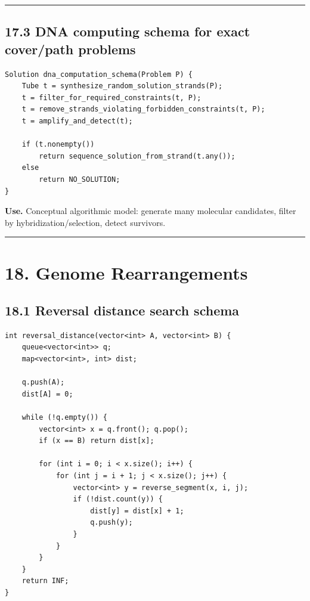 \documentclass[11pt]{article}
\begin{document}
\begin{center}\rule{0.5\linewidth}{0.5pt}\end{center}

\subsection{17.3 DNA computing schema for exact cover/path problems}\label{dna-computing-schema-for-exact-coverpath-problems}

\begin{verbatim}
Solution dna_computation_schema(Problem P) {
    Tube t = synthesize_random_solution_strands(P);
    t = filter_for_required_constraints(t, P);
    t = remove_strands_violating_forbidden_constraints(t, P);
    t = amplify_and_detect(t);

    if (t.nonempty())
        return sequence_solution_from_strand(t.any());
    else
        return NO_SOLUTION;
}
\end{verbatim}

\textbf{Use.} Conceptual algorithmic model: generate many molecular candidates, filter by hybridization/selection, detect survivors.

\begin{center}\rule{0.5\linewidth}{0.5pt}\end{center}

\section{18. Genome Rearrangements}\label{genome-rearrangements}

\subsection{18.1 Reversal distance search schema}\label{reversal-distance-search-schema}

\begin{verbatim}
int reversal_distance(vector<int> A, vector<int> B) {
    queue<vector<int>> q;
    map<vector<int>, int> dist;

    q.push(A);
    dist[A] = 0;

    while (!q.empty()) {
        vector<int> x = q.front(); q.pop();
        if (x == B) return dist[x];

        for (int i = 0; i < x.size(); i++) {
            for (int j = i + 1; j < x.size(); j++) {
                vector<int> y = reverse_segment(x, i, j);
                if (!dist.count(y)) {
                    dist[y] = dist[x] + 1;
                    q.push(y);
                }
            }
        }
    }
    return INF;
}
\end{verbatim}
\end{document}
